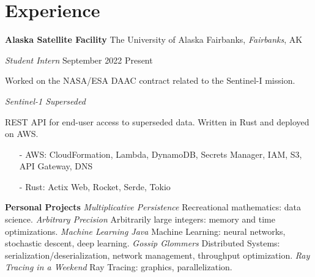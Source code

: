 ﻿\section{Experience}

\textbf{Alaska Satellite Facility}
\hfill
The University of Alaska Fairbanks, \textit{Fairbanks}, AK

\textit{Student Intern}
\hfill
{September 2022 \textendash\! Present}

\bigbreak

Worked on the NASA/ESA DAAC contract related to the Sentinel-I mission.

\bigbreak

\textit{Sentinel-1 Superseded}

REST API for end-user access to superseded data. Written in Rust and deployed on AWS.
\begin{itemize}\setlength\itemsep{-0.15cm}
    \item [-] AWS: CloudFormation, Lambda, DynamoDB, Secrets Manager, IAM, S3, API Gateway, DNS
    \item [-] Rust: Actix Web, Rocket, Serde, Tokio
\end{itemize}

\textbf{Personal Projects}
\bigbreak
\textit{Multiplicative Persistence} \textendash\! Recreational mathematics: data science.
\bigbreak
\textit{Arbitrary Precision} \textendash\! Arbitrarily large integers: memory and time optimizations.
\bigbreak
\textit{Machine Learning Java} \textendash\! Machine Learning: neural networks, stochastic descent, deep learning.
\bigbreak
\textit{Gossip Glommers} \textendash\! Distributed Systems: serialization/deserialization, network management, throughput optimization.
\bigbreak
\textit{Ray Tracing in a Weekend} \textendash\! Ray Tracing: graphics, parallelization.
